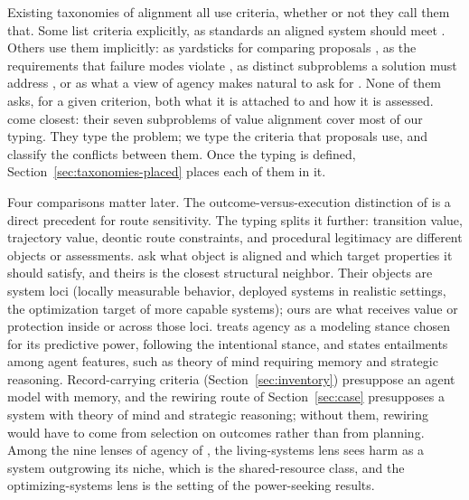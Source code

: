 \documentclass[11pt]{article}
\begin{document}
Existing taxonomies of alignment all use criteria, whether or not they call them that.
Some list criteria explicitly, as standards an aligned system should meet \parencite{gabriel2020alignment,zhixuan2025beyondpreferences,baum2025disentangling,jha2026priorities,ji2025survey}.
Others use them implicitly: as yardsticks for comparing proposals \parencite{hubinger2020eleven,krakovna2022paradigms}, as the requirements that failure modes violate \parencite{amodei2016concrete}, as distinct subproblems a solution must address \parencite{harris2026taxonomy}, or as what a view of agency makes natural to ask for \parencite{hallgren2026taxonomy,beard2026lenses}.
None of them asks, for a given criterion, both what it is attached to and how it is assessed.
\textcite{harris2026taxonomy} come closest: their seven subproblems of value alignment cover most of our typing.
They type the problem; we type the criteria that proposals use, and classify the conflicts between them.
Once the typing is defined, Section~\ref{sec:taxonomies-placed} places each of them in it.

Four comparisons matter later.
The outcome-versus-execution distinction of \textcite{baum2025disentangling} is a direct precedent for route sensitivity.
The typing splits it further: transition value, trajectory value, deontic route constraints, and procedural legitimacy are different objects or assessments.
\textcite{jha2026priorities} ask what object is aligned and which target properties it should satisfy, and theirs is the closest structural neighbor.
Their objects are system loci (locally measurable behavior, deployed systems in realistic settings, the optimization target of more capable systems); ours are what receives value or protection inside or across those loci.
\textcite{hallgren2026taxonomy} treats agency as a modeling stance chosen for its predictive power, following the intentional stance, and states entailments among agent features, such as theory of mind requiring memory and strategic reasoning.
Record-carrying criteria (Section~\ref{sec:inventory}) presuppose an agent model with memory, and the rewiring route of Section~\ref{sec:case} presupposes a system with theory of mind and strategic reasoning; without them, rewiring would have to come from selection on outcomes rather than from planning.
Among the nine lenses of agency of \textcite{beard2026lenses}, the living-systems lens sees harm as a system outgrowing its niche, which is the shared-resource class, and the optimizing-systems lens is the setting of the power-seeking results.
\end{document}
